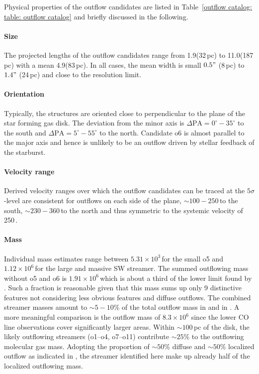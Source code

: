 Physical properties of the outflow candidates are listed in Table~\ref{outflow catalog: table: outflow catalog} and briefly discussed in the following.

\paragraph{Size}
The projected lengths of the outflow candidates range from 1.9\arcsec (32\,pc) to 11.0\arcsec (187\,pc) with a mean 4.9\arcsec (83\,pc). In all cases, the mean width is small $0.5"$ (8\,pc) to $1.4"$ (24\,pc) and close to the resolution limit.

\paragraph{Orientation}
Typically, the structures are oriented close to perpendicular to the plane of the star forming gas disk. The deviation from the minor axis is $\Delta\mathrm{PA} = 0^\circ - 35^\circ$ to the south and $\Delta\mathrm{PA} = 5^\circ - 55^\circ$ to the north.
Candidate o6 is almost parallel to the major axis and hence is unlikely to be an outflow driven by stellar feedback of the starburst.

\paragraph{Velocity range}
Derived velocity ranges over which the outflow candidates can be traced at the $5\sigma$-level are consistent for outflows on each side of the plane, $\sim 100-250$\,\kms to the south, $\sim 230-360$\,\kms to the north and thus symmetric to the systemic velocity of 250\,\kms.

\paragraph{Mass}
Individual mass estimates range between $5.31 \times 10^3$\,\Msun for the small o5 and $1.12 \times 10^6$\,\Msun for the large and massive SW streamer. The summed outflowing mass without o5 and o6 is $1.91\times 10^6$\,\Msun which is about a third of the lower limit found by \citet[][$6.6 \times 10^6$\,\Msun]{2013Natur.499..450B}. Such a fraction is reasonable given that this mass sums up only 9 distinctive features not considering less obvious features and diffuse outflows. 
The combined streamer masses amount to $\sim 5-10$\% of the total outflow mass in  and  in \citet[Chapter~\ref{chapter: outflow}]{2019ApJ...881...43K}. A more meaningful comparison is the  outflow mass of $8.3 \times 10^6$ since the lower CO line observations cover significantly larger areas. Within $\sim 100$\,pc of the disk, the likely outflowing streamers (o1--o4, o7--o11) contribute $\sim 25$\% to the outflowing molecular gas mass. Adopting the proportion of $\sim 50$\% diffuse and $\sim 50$\% localized outflow as indicated in \citet[Chapter~\ref{chapter: outflow}]{2019ApJ...881...43K}, the streamer identified here make up already half of the localized outflowing  mass.

